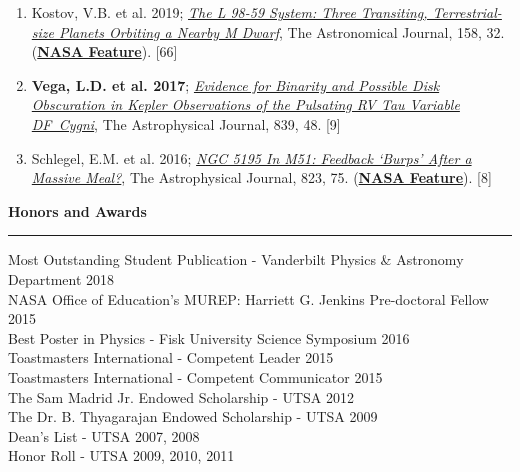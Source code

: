 \documentclass[letter,11pt]{article}
\begin{document}
\begin{enumerate}[\bfseries 1.]
\item Kostov, V.B. et al. 2019; \href{https://ui.adsabs.harvard.edu/abs/2019AJ....158...32K/abstract}{{\it The L 98-59 System: Three Transiting, Terrestrial-size Planets Orbiting a Nearby M Dwarf}}, The Astronomical Journal, 158, 32.
(\href{https://www.nasa.gov/feature/goddard/2019/nasa-s-tess-mission-finds-its-smallest-planet-yet}{\bf NASA Feature}). [66]

\item {\bf Vega, L.D. et al. 2017}; \href{https://ui.adsabs.harvard.edu/abs/2017ApJ...839...48V/abstract}{{\it Evidence for Binarity and Possible Disk Obscuration in Kepler Observations of the Pulsating RV Tau Variable DF~Cygni}}, The Astrophysical Journal, 839, 48. [9]

\item Schlegel, E.M. et al. 2016; \href{https://ui.adsabs.harvard.edu/abs/2016ApJ...823...75S/abstract}{{\it NGC 5195 In M51: Feedback ‘Burps’ After a Massive Meal?}}, The Astrophysical Journal, 823, 75. (\href{https://www.nasa.gov/mission_pages/chandra/nasa-s-chandra-finds-supermassive-black-hole-burping-nearby.html}{\bf NASA Feature}). [8]

\end{enumerate}


\noindent
{\bf Honors and Awards} \\
\vspace{-10mm}
\begin{center}
\rule{\textwidth}{0.2mm}
\end{center}
\vspace{-3mm}
\noindent
Most Outstanding Student Publication - Vanderbilt Physics \& Astronomy Department \hfill 2018 \\
NASA Office of Education's MUREP: Harriett G. Jenkins Pre-doctoral Fellow \hfill 2015 \\
Best Poster in Physics - Fisk University Science Symposium \hfill 2016 \\
Toastmasters International - Competent Leader \hfill 2015 \\
Toastmasters International - Competent Communicator \hfill 2015 \\
The Sam Madrid Jr. Endowed Scholarship - UTSA \hfill 2012 \\
The Dr. B. Thyagarajan Endowed Scholarship - UTSA \hfill 2009 \\
Dean’s List - UTSA \hfill 2007, 2008 \\
Honor Roll - UTSA \hfill 2009, 2010, 2011 \\
\end{document}
